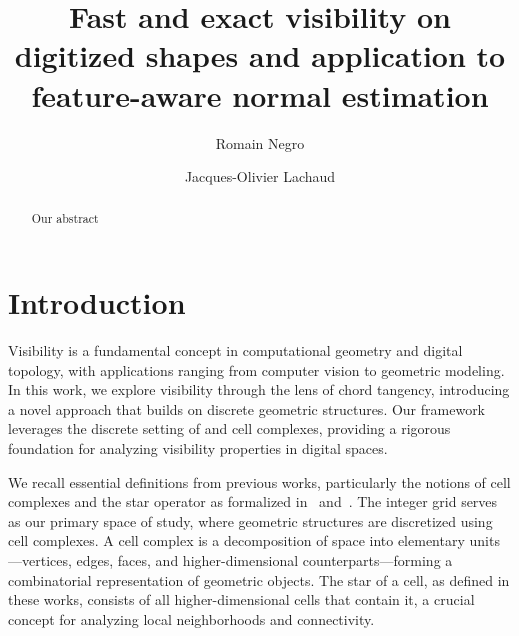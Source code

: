 \documentclass[runningheads]{llncs}
\begin{document}
%
    \title{Fast and exact visibility on digitized shapes and application to feature-aware normal estimation}
%
%
    \author{Romain Negro \and
    Jacques-Olivier Lachaud}
%
%
%
    \maketitle              %
%
    \begin{abstract}
        Our abstract
    \end{abstract}



    \section{Introduction}


    Visibility is a fundamental concept in computational geometry and digital topology, with applications ranging from computer vision to geometric modeling.
    In this work, we explore visibility through the lens of chord tangency, introducing a novel approach that builds on discrete geometric structures.
    Our framework leverages the discrete setting of and cell complexes, providing a rigorous foundation for analyzing visibility properties in digital spaces.

    We recall essential definitions from previous works, particularly the notions of cell complexes and the star operator as formalized in~\cite{lachaud:2021-dgmm} and~\cite{lachaud:2022-jmiv}.
    The integer grid serves as our primary space of study, where geometric structures are discretized using cell complexes.
    A cell complex is a decomposition of space into elementary units—vertices, edges, faces, and higher-dimensional counterparts—forming a combinatorial representation of geometric objects.
    The star of a cell, as defined in these works, consists of all higher-dimensional cells that contain it, a crucial concept for analyzing local neighborhoods and connectivity.
\end{document}
